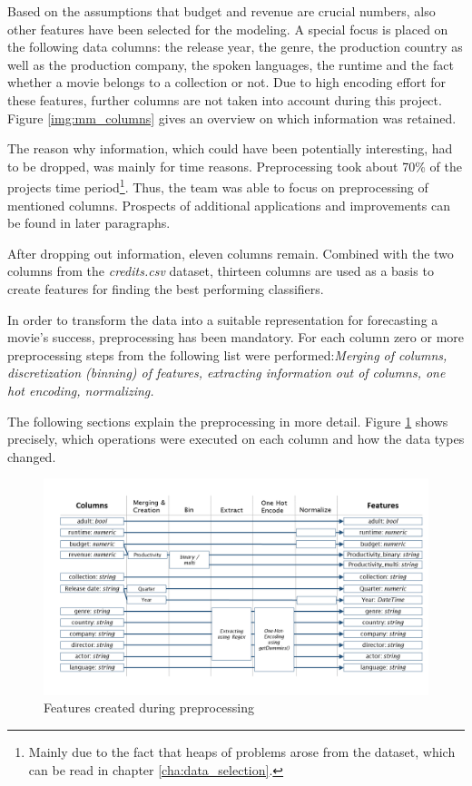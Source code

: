 Based on the assumptions that budget and revenue are crucial numbers, also other features have been selected for the modeling. A special focus is placed on the following data columns: the release year, the genre, the production country as well as the production company, the spoken languages, the runtime and the fact whether a movie belongs to a collection or not. Due to high encoding effort for these features, further columns are not taken into account during this project. Figure \ref{img:mm_columns} gives an overview on which information was retained.

The reason why information, which could have been potentially interesting, had to be dropped, was mainly for time reasons. Preprocessing took about 70\% of the projects time period\footnote{Mainly due to the fact that heaps of problems arose from the dataset, which can be read in chapter \ref{cha:data_selection}.}. Thus, the team was able to focus on preprocessing of mentioned columns. Prospects of additional applications and improvements can be found in later paragraphs.

After dropping out information, eleven columns remain. Combined with the two columns from the \textit{credits.csv} dataset, thirteen columns are used as a basis to create features for finding the best performing classifiers.

In order to transform the data into a suitable representation for forecasting a movie's success, preprocessing has been mandatory. For each column zero or more preprocessing steps from the following list were performed:\textit{Merging of columns, discretization (binning) of features, extracting information out of columns, one hot encoding, normalizing.}

The following sections explain the preprocessing in more detail. Figure \ref{img:features} shows precisely, which operations were executed on each column and how the data types changed.
\begin{figure}[h]
	\includegraphics[width=\textwidth]{images/3_features.png}
	\caption{Features created during preprocessing}
	\label{img:features}
\end{figure}
\FloatBarrier

